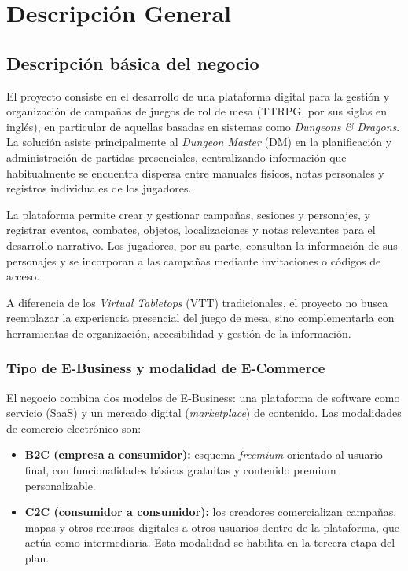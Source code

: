 \capredactadotrue
\section{Descripción General}

\subsection{Descripción básica del negocio}
El proyecto consiste en el desarrollo de una plataforma digital para la gestión y organización de campañas de juegos de rol de mesa (TTRPG, por sus siglas en inglés), en particular de aquellas basadas en sistemas como \textit{Dungeons \& Dragons}. La solución asiste principalmente al \textit{Dungeon Master} (DM) en la planificación y administración de partidas presenciales, centralizando información que habitualmente se encuentra dispersa entre manuales físicos, notas personales y registros individuales de los jugadores.

La plataforma permite crear y gestionar campañas, sesiones y personajes, y registrar eventos, combates, objetos, localizaciones y notas relevantes para el desarrollo narrativo. Los jugadores, por su parte, consultan la información de sus personajes y se incorporan a las campañas mediante invitaciones o códigos de acceso.

A diferencia de los \textit{Virtual Tabletops} (VTT) tradicionales, el proyecto no busca reemplazar la experiencia presencial del juego de mesa, sino complementarla con herramientas de organización, accesibilidad y gestión de la información.

\subsubsection{Tipo de E-Business y modalidad de E-Commerce}
El negocio combina dos modelos de E-Business: una plataforma de software como servicio (SaaS) y un mercado digital (\textit{marketplace}) de contenido. Las modalidades de comercio electrónico son:
\begin{itemize}
  \item \textbf{B2C (empresa a consumidor):} esquema \textit{freemium} orientado al usuario final, con funcionalidades básicas gratuitas y contenido premium personalizable.
  \item \textbf{C2C (consumidor a consumidor):} los creadores comercializan campañas, mapas y otros recursos digitales a otros usuarios dentro de la plataforma, que actúa como intermediaria. Esta modalidad se habilita en la tercera etapa del plan.
\end{itemize}

